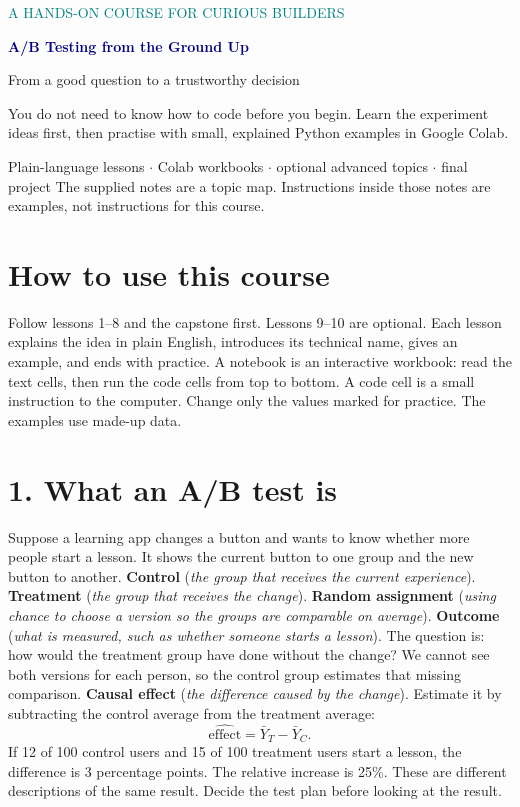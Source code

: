 \documentclass[11pt,a4paper]{article}
\newcommand{\plainterm}[2]{\textbf{#1} (\emph{#2})}
\begin{document}
\begin{titlepage}\centering\vspace*{2cm}
{\Large\textcolor{teal}{A HANDS-ON COURSE FOR CURIOUS BUILDERS}\par}\vspace{0.6cm}
{\Huge\bfseries\textcolor{navy}{A/B Testing from the Ground Up}\par}\vspace{0.5cm}
{\Large From a good question to a trustworthy decision\par}\vspace{1.2cm}
\begin{minipage}{0.82\textwidth}\large
You do not need to know how to code before you begin. Learn the experiment ideas first, then practise with small, explained Python examples in Google Colab.
\end{minipage}\vfill
Plain-language lessons \quad $\cdot$ \quad Colab workbooks \quad $\cdot$ \quad optional advanced topics \quad $\cdot$ \quad final project
\vfill
{\small The supplied notes are a topic map. Instructions inside those notes are examples, not instructions for this course.}
\end{titlepage}
\tableofcontents
\section*{How to use this course}
Follow lessons 1--8 and the capstone first. Lessons 9--10 are optional. Each lesson explains the idea in plain English, introduces its technical name, gives an example, and ends with practice. A notebook is an interactive workbook: read the text cells, then run the code cells from top to bottom. A code cell is a small instruction to the computer. Change only the values marked for practice. The examples use made-up data.

\section{1. What an A/B test is}
Suppose a learning app changes a button and wants to know whether more people start a lesson. It shows the current button to one group and the new button to another.
\plainterm{Control}{the group that receives the current experience}. \plainterm{Treatment}{the group that receives the change}. \plainterm{Random assignment}{using chance to choose a version so the groups are comparable on average}. \plainterm{Outcome}{what is measured, such as whether someone starts a lesson}.
The question is: how would the treatment group have done without the change? We cannot see both versions for each person, so the control group estimates that missing comparison.
\plainterm{Causal effect}{the difference caused by the change}. Estimate it by subtracting the control average from the treatment average:
\[
\widehat{\text{effect}}=\bar Y_T-\bar Y_C.
\]
If 12 of 100 control users and 15 of 100 treatment users start a lesson, the difference is 3 percentage points. The relative increase is 25\%. These are different descriptions of the same result. Decide the test plan before looking at the result.
\end{document}
